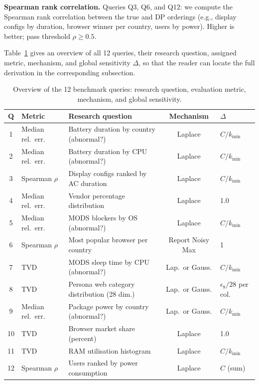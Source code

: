 \documentclass[12pt,letterpaper]{article}
\begin{document}
\textbf{Spearman rank correlation.} Queries Q3, Q6, and Q12: we compute the Spearman rank correlation between the true and DP orderings (e.g., display configs by duration, browser winner per country, users by power). Higher is better; pass threshold $\rho \geq 0.5$.

Table~\ref{tab:query_summary} gives an overview of all 12 queries, their research question, assigned metric, mechanism, and global sensitivity $\Delta$, so that the reader can locate the full derivation in the corresponding subsection.

\begin{table}[H]
\centering
\caption{Overview of the 12 benchmark queries: research question, evaluation metric, mechanism, and global sensitivity.}
\label{tab:query_summary}
\small
\begin{tabular}{@{}clp{3.4cm}cp{2.2cm}@{}}
\toprule
\textbf{Q} & \textbf{Metric} & \textbf{Research question} & \textbf{Mechanism} & \textbf{$\Delta$} \\
\midrule
1 & Median rel.\ err. & Battery duration by country (abnormal?) & Laplace & $C/k_{\min}$ \\
2 & Median rel.\ err. & Battery duration by CPU (abnormal?) & Laplace & $C/k_{\min}$ \\
3 & Spearman $\rho$ & Display configs ranked by AC duration & Laplace & $C/k_{\min}$ \\
4 & Median rel.\ err. & Vendor percentage distribution & Laplace & 1.0 \\
5 & Median rel.\ err. & MODS blockers by OS (abnormal?) & Laplace & $C/k_{\min}$ \\
6 & Spearman $\rho$ & Most popular browser per country & Report Noisy Max & 1 \\
7 & TVD & MODS sleep time by CPU (abnormal?) & Lap.\ or Gauss. & $C/k_{\min}$ \\
8 & TVD & Persona web category distribution (28 dim.) & Lap.\ or Gauss. & $\epsilon_8/28$ per col. \\
9 & Median rel.\ err. & Package power by country (abnormal?) & Lap.\ or Gauss. & $C/k_{\min}$ \\
10 & TVD & Browser market share (percent) & Laplace & 1.0 \\
11 & TVD & RAM utilisation histogram & Laplace & $C/k_{\min}$ \\
12 & Spearman $\rho$ & Users ranked by power consumption & Laplace & $C$ (sum) \\
\bottomrule
\end{tabular}
\end{table}
\end{document}
